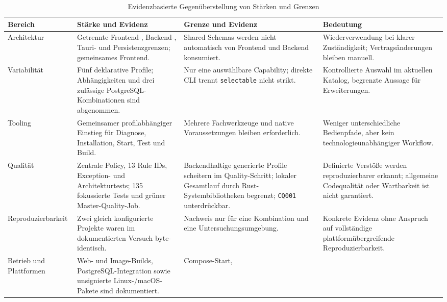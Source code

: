 \begin{table}[htbp]
  \centering
  \scriptsize
  \renewcommand{\arraystretch}{1.08}
  \caption{Evidenzbasierte Gegenüberstellung von Stärken und Grenzen}
  \label{tab:strengths-limitations}
  \begin{tabularx}{\textwidth}{@{}>{\raggedright\arraybackslash}p{}>{\raggedright\arraybackslash}p{}>{\raggedright\arraybackslash}p{}>{\raggedright\arraybackslash}X@{}}
    \toprule
    \textbf{Bereich} & \textbf{Stärke und Evidenz} & \textbf{Grenze und Evidenz} & \textbf{Bedeutung} \\
    \midrule
    Architektur & Getrennte Frontend-, Backend-, Tauri- und Persistenzgrenzen;
      gemeinsames Frontend. & Shared Schemas werden nicht automatisch von
      Frontend und Backend konsumiert. & Wiederverwendung bei klarer
      Zuständigkeit; Vertragsänderungen bleiben manuell. \\
    Variabilität & Fünf deklarative Profile; Abhängigkeiten und drei zulässige
      PostgreSQL-Kombinationen sind abgenommen. & Nur eine auswählbare
      Capability; direkte CLI trennt \texttt{selectable} nicht strikt. &
      Kontrollierte Auswahl im aktuellen Katalog, begrenzte Aussage für
      Erweiterungen. \\
    Tooling & Gemeinsamer profilabhängiger Einstieg für Diagnose,
      Installation, Start, Test und Build. & Mehrere Fachwerkzeuge und native
      Voraussetzungen bleiben erforderlich. & Weniger unterschiedliche
      Bedienpfade, aber kein technologieunabhängiger Workflow. \\
    Qualität & Zentrale Policy, 13 Rule IDs, Exception- und Architekturtests;
      135 fokussierte Tests und grüner Master-Quality-Job. & Backendhaltige
      generierte Profile scheitern im Quality-Schritt; lokaler Gesamtlauf durch
      Rust-Systembibliotheken begrenzt; \texttt{CQ001} unterdrückbar. &
      Definierte Verstöße werden reproduzierbarer erkannt; allgemeine
      Codequalität oder Wartbarkeit ist nicht garantiert. \\
    Reproduzierbarkeit & Zwei gleich konfigurierte Projekte waren im
      dokumentierten Versuch byte-identisch. & Nachweis nur für eine
      Kombination und eine Untersuchungsumgebung. & Konkrete Evidenz ohne
      Anspruch auf vollständige plattformübergreifende Reproduzierbarkeit. \\
    Betrieb und Plattformen & Web- und Image-Builds, PostgreSQL-Integration
      sowie unsignierte Linux-/macOS-Pakete sind dokumentiert. & Compose-Start,

\end{tabularx}
\end{table}
